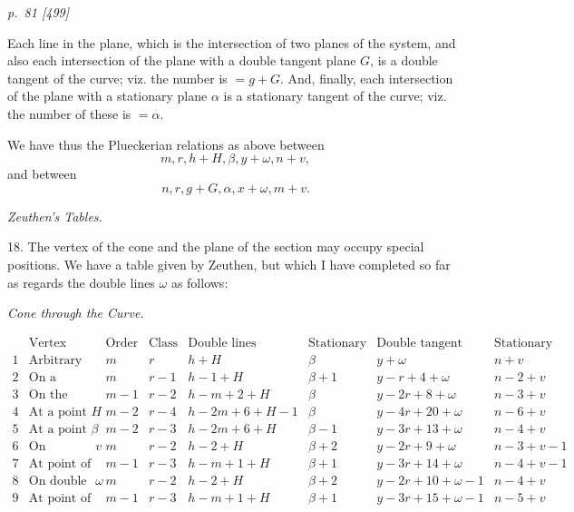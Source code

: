 \documentclass[11pt,a4paper]{article}
\newcommand{\pagemarker}[2]{\clearpage\noindent\textit{p.~#1 [#2]}\par\medskip}
\begin{document}
\pagemarker{81}{499}
Each line in the plane, which is the intersection of two planes of the system, and also
each intersection of the plane with a double tangent plane \(G\), is a double tangent
of the curve; viz. the number is \(=g+G\). And, finally, each intersection of the
plane with a stationary plane \(\alpha\) is a stationary tangent of the curve; viz. the
number of these is \(=\alpha\).

We have thus the Plueckerian relations as above between
\[
  m,r,h+H,\beta,y+\omega,n+v,
\]
and between
\[
  n,r,g+G,\alpha,x+\omega,m+v.
\]

\begin{center}\textit{Zeuthen's Tables.}\end{center}

18. The vertex of the cone and the plane of the section may occupy special positions.
We have a table given by Zeuthen, but which I have completed so far as regards the
double lines \(\omega\) as follows:

\begin{center}\textit{Cone through the Curve.}\end{center}
\tiny
\[
\begin{array}{c|l|c|c|c|c|c|c}
&\text{Vertex}&\text{Order}&\text{Class}&\text{Double lines}
&\text{Stationary lines}&\text{Double tangent planes}&\text{Stationary tangent planes}\\ \hline
1&\text{Arbitrary}&m&r&h+H&\beta&y+\omega&n+v\\
2&\text{On a tangent}&m&r-1&h-1+H&\beta+1&y-r+4+\omega&n-2+v\\
3&\text{On the curve}&m-1&r-2&h-m+2+H&\beta&y-2r+8+\omega&n-3+v\\
4&\text{At a point }H&m-2&r-4&h-2m+6+H-1&\beta&y-4r+20+\omega&n-6+v\\
5&\text{At a point }\beta&m-2&r-3&h-2m+6+H&\beta-1&y-3r+13+\omega&n-4+v\\
6&\text{On stationary tangent }v&m&r-2&h-2+H&\beta+2&y-2r+9+\omega&n-3+v-1\\
7&\text{At point of contact of ditto}&m-1&r-3&h-m+1+H&\beta+1&y-3r+14+\omega&n-4+v-1\\
8&\text{On double tangent }\omega&m&r-2&h-2+H&\beta+2&y-2r+10+\omega-1&n-4+v\\
9&\text{At point of contact of ditto}&m-1&r-3&h-m+1+H&\beta+1&y-3r+15+\omega-1&n-5+v
\end{array}
\]
\normalsize
\end{document}
